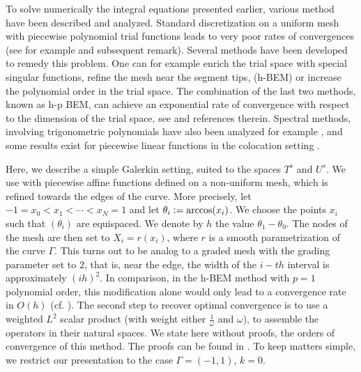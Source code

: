 \documentclass[a4paper]{article}
\begin{document}
\label{subsec:GalerkinSetting}
To solve numerically the integral equations presented earlier, various method have been described and analyzed. Standard discretization on a uniform mesh with piecewise polynomial trial functions leads to very poor rates of convergences (see for example \cite[Chap. 4, ]{sauter2011boundary} and subsequent remark). Several methods have been developed to remedy this problem. One can for example enrich the trial space with special singular functions, refine the mesh near the segment tips, (h-BEM) or increase the polynomial order in the trial space. The combination of the last two methods, known as h-p BEM, can achieve an exponential rate of convergence with respect to the dimension of the trial space, see \cite{postell1990h} and references therein. Spectral methods, involving trigonometric polynomials have also been analyzed for example \cite{bruno2012second}, and some results exist for piecewise linear functions in the colocation setting \cite{costabel1988convergence}. 

Here, we describe a simple Galerkin setting, suited to the spaces $T^s$ and $U^s$. We use with piecewise affine functions defined on a non-uniform mesh, which is refined towards the edges of the curve. More precisely, let
$-1 = x_0 < x_1 < \cdots < x_N = 1$ and let $\theta_i \mathrel{\mathop:}= \arccos(x_i)$. We choose the points $x_i$ such that $(\theta_i)$ are equispaced. We denote by $h$ the value $\theta_{1} - \theta_0$. The nodes of the mesh are then set to $X_i = r(x_i)$, where $r$ is a smooth parametrization of the curve $\Gamma$. This turns out to be analog to a graded mesh with the grading parameter set to $2$, that is, near the edge, the width of the $i-th$ interval is approximately $(ih)^2$. In comparison, in the h-BEM method with $p=1$ polynomial order, this modification alone would only lead to a convergence rate in $O(h)$ (cf. \cite[Theorem 1.3]{postell1990h}). The second step to recover optimal convergence is to use a weighted $L^2$ scalar product (with weight either $\frac{1}{\omega}$ and $\omega$), to assemble the operators in their natural spaces. We state here without proofs, the orders of convergence of this method. The proofs can be found in \cite{}. To keep matters simple, we restrict our presentation to the case $\Gamma = (-1,1)$, $k = 0$. 
\end{document}
